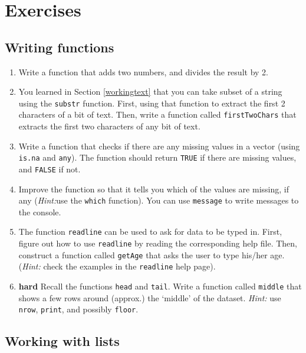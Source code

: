 \documentclass[]{book}
\begin{document}
\hypertarget{exercises-3}{%
\section{Exercises}\label{exercises-3}}

\hypertarget{writing-functions}{%
\subsection{Writing functions}\label{writing-functions}}

\begin{enumerate}
\def\labelenumi{\arabic{enumi}.}
\item
  Write a function that adds two numbers, and divides the result by 2.
\item
  You learned in Section \ref{workingtext} that you can take subset of a string using the \texttt{substr} function. First, using that function to extract the first 2 characters of a bit of text. Then, write a function called \texttt{firstTwoChars} that extracts the first two characters of any bit of text.
\item
  Write a function that checks if there are any missing values in a vector (using \texttt{is.na} and \texttt{any}). The function should return \texttt{TRUE} if there are missing values, and \texttt{FALSE} if not.
\item
  Improve the function so that it tells you which of the values are missing, if any (\emph{Hint:}use the \texttt{which} function). You can use \texttt{message} to write messages to the console.
\item
  The function \texttt{readline} can be used to ask for data to be typed in. First, figure out how to use \texttt{readline} by reading the corresponding help file. Then, construct a function called \texttt{getAge} that asks the user to type his/her age. (\emph{Hint:} check the examples in the \texttt{readline} help page).
\item
  \textbf{hard} Recall the functions \texttt{head} and \texttt{tail}. Write a function called \texttt{middle} that shows a few rows around (approx.) the `middle' of the dataset. \emph{Hint:} use \texttt{nrow}, \texttt{print}, and possibly \texttt{floor}.
\end{enumerate}

\hypertarget{working-with-lists}{%
\subsection{Working with lists}\label{working-with-lists}}
\end{document}
